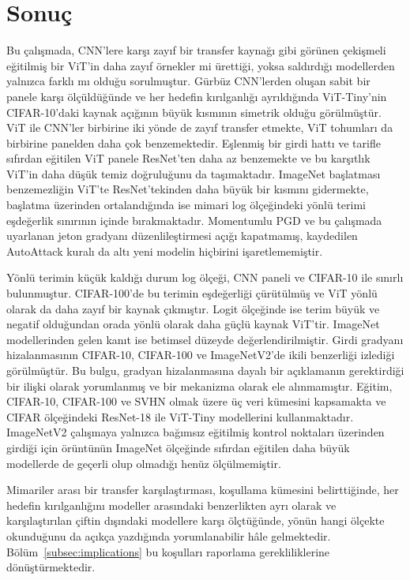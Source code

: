 \section{Sonuç}
\label{sec:conclusion}

Bu çalışmada, CNN'lere karşı zayıf bir transfer kaynağı gibi görünen çekişmeli eğitilmiş bir ViT'in daha zayıf örnekler mi ürettiği, yoksa saldırdığı modellerden yalnızca farklı mı olduğu sorulmuştur. Gürbüz CNN'lerden oluşan sabit bir panele karşı ölçüldüğünde ve her hedefin kırılganlığı ayrıldığında ViT-Tiny'nin CIFAR-10'daki kaynak açığının büyük kısmının simetrik olduğu görülmüştür. ViT ile CNN'ler birbirine iki yönde de zayıf transfer etmekte, ViT tohumları da birbirine panelden daha çok benzemektedir. Eşlenmiş bir girdi hattı ve tarifle sıfırdan eğitilen ViT panele ResNet'ten daha az benzemekte ve bu karşıtlık ViT'in daha düşük temiz doğruluğunu da taşımaktadır. ImageNet başlatması benzemezliğin ViT'te ResNet'tekinden daha büyük bir kısmını gidermekte, başlatma üzerinden ortalandığında ise mimari log ölçeğindeki yönlü terimi eşdeğerlik sınırının içinde bırakmaktadır. Momentumlu PGD ve bu çalışmada uyarlanan jeton gradyanı düzenlileştirmesi açığı kapatmamış, kaydedilen AutoAttack kuralı da altı yeni modelin hiçbirini işaretlememiştir.

Yönlü terimin küçük kaldığı durum log ölçeği, CNN paneli ve CIFAR-10 ile sınırlı bulunmuştur. CIFAR-100'de bu terimin eşdeğerliği çürütülmüş ve ViT yönlü olarak da daha zayıf bir kaynak çıkmıştır. Logit ölçeğinde ise terim büyük ve negatif olduğundan orada yönlü olarak daha güçlü kaynak ViT'tir. ImageNet modellerinden gelen kanıt ise betimsel düzeyde değerlendirilmiştir. Girdi gradyanı hizalanmasının CIFAR-10, CIFAR-100 ve ImageNetV2'de ikili benzerliği izlediği görülmüştür. Bu bulgu, gradyan hizalanmasına dayalı bir açıklamanın gerektirdiği bir ilişki olarak yorumlanmış ve bir mekanizma olarak ele alınmamıştır. Eğitim, CIFAR-10, CIFAR-100 ve SVHN olmak üzere üç veri kümesini kapsamakta ve CIFAR ölçeğindeki ResNet-18 ile ViT-Tiny modellerini kullanmaktadır. ImageNetV2 çalışmaya yalnızca bağımsız eğitilmiş kontrol noktaları üzerinden girdiği için örüntünün ImageNet ölçeğinde sıfırdan eğitilen daha büyük modellerde de geçerli olup olmadığı henüz ölçülmemiştir.

Mimariler arası bir transfer karşılaştırması, koşullama kümesini belirttiğinde, her hedefin kırılganlığını modeller arasındaki benzerlikten ayrı olarak ve karşılaştırılan çiftin dışındaki modellere karşı ölçtüğünde, yönün hangi ölçekte okunduğunu da açıkça yazdığında yorumlanabilir hâle gelmektedir. Bölüm~\ref{subsec:implications} bu koşulları raporlama gerekliliklerine dönüştürmektedir.
